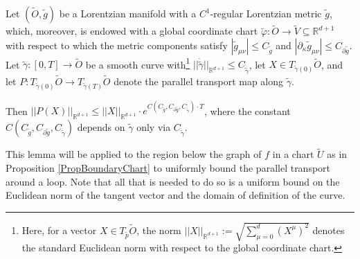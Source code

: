 \documentclass[reqno]{article}
\newcommand{\R}{\mathbb{R}}
\begin{document}
\begin{lemma}\label{LemBoundParallelTransport}
Let $(\tilde{O}, \tilde{g})$ be a Lorentzian manifold with a $C^1$-regular Lorentzian metric $\tilde{g}$, which, moreover, is endowed with a global coordinate chart $\tilde{\varphi} : \tilde{O} \to \tilde{V} \subseteq \R^{d+1}$ with respect to which the metric components satisfy $|\tilde{g}_{\mu \nu}| \leq C_{\tilde{g}}$ and $|\partial_\kappa \tilde{g}_{\mu \nu}| \leq C_{\partial \tilde{g}}$. Let $\tilde{\gamma} : [0,T] \to \tilde{O}$ be a smooth curve with\footnote{Here, for a vector $X \in T_{\tilde{p}}\tilde{O}$, the norm $||X||_{\R^{d+1}} := \sqrt{\sum_{\mu = 0}^d (X^\mu)^2}$ denotes the standard Euclidean norm with respect to the global coordinate chart.}  
$||\dot{\tilde{\gamma}}||_{\R^{d+1}} \leq C_{\dot{\tilde{\gamma}}}$, let $X \in T_{\tilde{\gamma}(0)}\tilde{O}$, and let $P : T_{\tilde{\gamma}(0)}\tilde{O} \to T_{\tilde{\gamma}(T)}\tilde{O}$ denote the parallel transport map along $\tilde{\gamma}$.

Then $||P(X)||_{\R^{d+1}} \leq ||X||_{\R^{d+1}} \cdot e^{C(C_{\tilde{g}}, C_{\partial \tilde{g}}, C_{\dot{\tilde{\gamma}}}) \cdot T}$, where the constant $C(C_{\tilde{g}}, C_{\partial \tilde{g}}, C_{\dot{\tilde{\gamma}}})$ depends on $\tilde{\gamma}$ only via $C_{\dot{\tilde{\gamma}}}$.
\end{lemma}

This lemma will be applied to the region below the graph of $f$ in a chart $\tilde{U}$ as in Proposition \ref{PropBoundaryChart} to uniformly bound the parallel transport around a loop. Note that all that is needed to do so is a uniform bound on the Euclidean norm of the tangent vector  and the domain of definition of the curve. 
\end{document}
